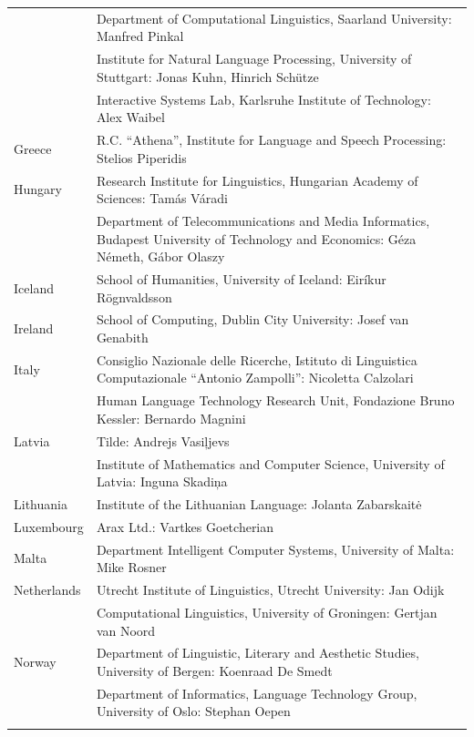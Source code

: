 \documentclass[10pt, plain]{../../metanetpaper}
\begin{document}
\begin{longtable}{@{}lp{137mm}@{}}
& Department of Computational Linguistics, Saarland University: Manfred Pinkal\\ \addlinespace
& Institute for Natural Language Processing, University of Stuttgart: Jonas Kuhn, Hinrich Schütze\\ \addlinespace
& Interactive Systems Lab, Karlsruhe Institute of Technology: Alex Waibel\\ \addlinespace 
Greece & R.C. “Athena”, Institute for Language and Speech Processing: Stelios Piperidis\\ \addlinespace
Hungary & Research Institute for Linguistics, Hungarian Academy of Sciences: Tamás Váradi\\  \addlinespace
& Department of Telecommunications and Media Informatics, Budapest University of Technology and Economics: Géza Németh, Gábor Olaszy\\ \addlinespace
Iceland & School of Humanities, University of Iceland: Eiríkur Rögnvaldsson\\ \addlinespace
Ireland & School of Computing, Dublin City University: Josef van Genabith\\ \addlinespace
Italy & Consiglio Nazionale delle Ricerche, Istituto di Linguistica Computazionale “Antonio Zampolli”: \newline Nicoletta Calzolari\\ \addlinespace
& Human Language Technology Research Unit, Fondazione Bruno Kessler:  Bernardo Magnini\\ \addlinespace 
Latvia & Tilde: Andrejs Vasiļjevs\\ \addlinespace  
& Institute of Mathematics and Computer Science, University of Latvia: Inguna Skadiņa\\ \addlinespace
Lithuania & Institute of the Lithuanian Language: Jolanta Zabarskaitė\\ \addlinespace
Luxembourg & Arax Ltd.: Vartkes Goetcherian\\ \addlinespace
Malta & Department Intelligent Computer Systems, University of Malta: Mike Rosner\\ \addlinespace
Netherlands & Utrecht Institute of Linguistics, Utrecht University: Jan Odijk\\ \addlinespace  
& Computational Linguistics, University of Groningen: Gertjan van Noord\\ \addlinespace
Norway & Department of Linguistic, Literary and Aesthetic Studies, University of Bergen: Koenraad De Smedt\\ \addlinespace  
& Department of Informatics, Language Technology Group, University of Oslo:  Stephan Oepen \\ \addlinespace

\end{longtable}
\end{document}
